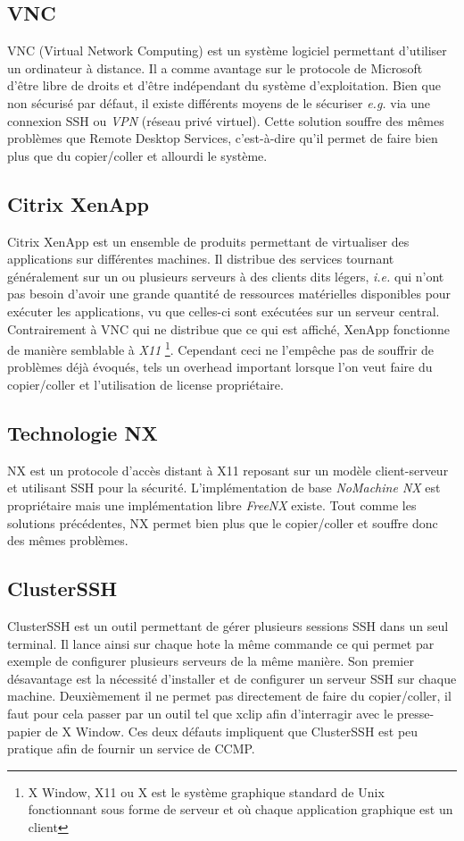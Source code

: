 \subsection{VNC}
VNC (Virtual Network Computing) \cite{wiki:vnc} est un système logiciel
permettant d'utiliser
un ordinateur à distance. Il a comme avantage sur le protocole de Microsoft
d'être libre de droits et d'être indépendant du système d'exploitation.
Bien que non sécurisé par défaut, il existe différents moyens de le sécuriser
\emph{e.g.} via une connexion SSH ou \emph{VPN} (réseau privé virtuel).
Cette solution souffre des mêmes problèmes que Remote Desktop Services,
c'est-à-dire qu'il permet de faire bien plus que du copier/coller et
allourdi le système.

\subsection{Citrix XenApp}
Citrix XenApp \cite{wiki:xenapp} est un ensemble de produits permettant de
virtualiser des applications sur différentes machines. Il distribue
des services tournant généralement sur un ou plusieurs serveurs à des
clients dits légers, \emph{i.e.} qui n'ont pas besoin d'avoir une grande
quantité de ressources matérielles disponibles pour exécuter
les applications, vu que celles-ci sont exécutées sur un serveur central.
Contrairement à VNC qui ne distribue que ce qui est
affiché, XenApp fonctionne de manière semblable à \emph{X11}
\footnote{X Window, X11 ou X est le système
graphique standard de Unix fonctionnant sous forme de serveur et où
chaque application graphique est un client}. Cependant ceci ne l'empêche
pas de souffrir de problèmes déjà évoqués, tels un overhead important lorsque
l'on veut faire du copier/coller et l'utilisation de license propriétaire.

\subsection{Technologie NX}
NX \cite{wiki:nx} est un protocole d'accès distant à X11 reposant sur un
modèle client-serveur et utilisant SSH pour la sécurité. L'implémentation
de base \emph{NoMachine NX} est propriétaire mais une implémentation libre
\emph{FreeNX} \cite{freenx} existe. Tout comme les solutions précédentes, NX
permet bien plus que le copier/coller et souffre donc des mêmes problèmes.

\subsection{ClusterSSH}
ClusterSSH\cite{clusterssh} est un outil permettant de gérer plusieurs
sessions SSH dans un seul terminal. Il lance ainsi sur chaque hote la même
commande ce qui permet par exemple de configurer plusieurs serveurs de la
même manière. Son premier désavantage est la nécessité d'installer et de
configurer un serveur SSH sur chaque machine. Deuxièmement il ne permet
pas directement de faire du copier/coller, il faut pour cela passer
par un outil tel que xclip\cite{xclip} afin d'interragir avec le presse-papier
de X Window. Ces deux défauts impliquent que ClusterSSH est peu pratique
afin de fournir un service de CCMP.

